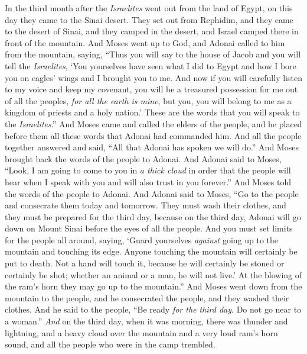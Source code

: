 \begin{biblechapter} %
 In the third month after the \textit{Israelites} went out from the land of Egypt, on this day they came to the Sinai desert.
\verse They set out from Rephidim, and they came to the desert of Sinai, and they camped in the desert, and Israel camped there in front of the mountain.
\verse And Moses went up to God, and Adonai called to him from the mountain, saying, “Thus you will say to the house of Jacob and you will tell the \textit{Israelites},
\verse ‘You yourselves have seen what I did to Egypt and how I bore you on eagles’ wings and I brought you to me.
\verse And now if you will carefully listen to my voice and keep my covenant, you will be a treasured possession for me out of all the peoples, \textit{for all the earth is mine},
\verse but you, you will belong to me as a kingdom of priests and a holy nation.’ These are the words that you will speak to the \textit{Israelites}.”
\verse And Moses came and called the elders of the people, and he placed before them all these words that Adonai had commanded him.
\verse And all the people together answered and said, “All that Adonai has spoken we will do.” And Moses brought back the words of the people to Adonai.
\verse And Adonai said to Moses, “Look, I am going to come to you in \textit{a thick cloud} in order that the people will hear when I speak with you and will also trust in you forever.” And Moses told the words of the people to Adonai.
\verse And Adonai said to Moses, “Go to the people and consecrate them today and tomorrow. They must wash their clothes,
\verse and they must be prepared for the third day, because on the third day, Adonai will go down on Mount Sinai before the eyes of all the people.
\verse And you must set limits for the people all around, saying, ‘Guard yourselves \textit{against} going up to the mountain and touching its edge. Anyone touching the mountain will certainly be put to death.
\verse Not a hand will touch it, because he will certainly be stoned or certainly be shot; whether an animal or a man, he will not live.’ At the blowing of the ram’s horn they may go up to the mountain.”
\verse And Moses went down from the mountain to the people, and he consecrated the people, and they washed their clothes.
\verse And he said to the people, “Be ready \textit{for the third day}. Do not go near to a woman.”
\verse \textit{And} on the third day, when it was morning, there was thunder and lightning, and a heavy cloud over the mountain and a very loud ram’s horn sound, and all the people who were in the camp trembled.

\end{biblechapter}
